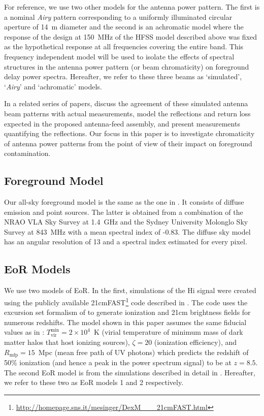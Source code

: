 \documentclass[preprint2,iop,numberedappendix,twocolappendix,appendixfloats]{emulateapj}
\begin{document}
For reference, we use two other models for the antenna power pattern. The first is a nominal {\it Airy} pattern corresponding to a uniformly illuminated circular aperture of 14~m diameter and the second is an achromatic model where the response of the design at 150~MHz of the HFSS model described above was fixed as the hypothetical response at all frequencies covering the entire band. This frequency independent model will be used to isolate the effects of spectral structures in the antenna power pattern (or beam chromaticity) on foreground delay power spectra. Hereafter, we refer to these three beams as `simulated', `{\it Airy}' and `achromatic' models.

In a related series of papers, \citet{neb16} discuss the agreement of these simulated antenna beam patterns with actual measurements, \citet{ewa16} model the reflections and return loss expected in the proposed antenna-feed assembly, and \citet{pat16} present measurements quantifying the reflections. Our focus in this paper is to investigate chromaticity of antenna power patterns from the point of view of their impact on foreground contamination.

\subsection{Foreground Model}\label{sec:foreground}

Our all-sky foreground model is the same as the one in \citet{thy15a}. It consists of diffuse emission \citep{deo08} and point sources. The latter is obtained from a combination of the NRAO VLA Sky Survey \citep[NVSS;][]{con98} at 1.4~GHz and the Sydney University Molonglo Sky Survey \citep[SUMSS;][]{boc99,mau03} at 843~MHz with a mean spectral index of -0.83. The diffuse sky model has an angular resolution of 13 and a spectral index estimated for every pixel.

\subsection{EoR Models}\label{sec:EoR-model}

We use two models of EoR. In the first, simulations of the H{\sc i} signal were created using the publicly available 21cmFAST\footnote{\url{http://homepage.sns.it/mesinger/DexM\_\_\_21cmFAST.html}} code described in \citet{mes11}. The code uses the excursion set formalism of \citet{fur04a} to generate ionization and 21cm brightness fields for numerous redshifts. The model shown in this paper assumes the same fiducial values as in \citet{ewa16}: $T_\text{vir}^\text{min} = 2 \times 10^4$~K (virial temperature of minimum mass of dark matter halos that host ionizing sources), $\zeta = 20$ (ionization efficiency), and $R_\text{mfp}=15$~Mpc (mean free path of UV photons) which predicts the redshift of 50\% ionization (and hence a peak in the power spectrum signal) to be at $z=8.5$. The second EoR model is from the simulations described in detail in \citet{lid08}. Hereafter, we refer to these two as EoR models 1 and 2 respectively. 
\end{document}
